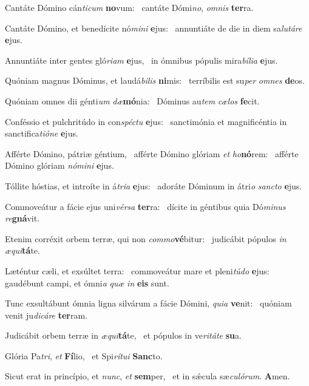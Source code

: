 \item Cantáte Dómino cán\textit{ticum} \textbf{no}vum:~\psstar{} cantáte Dómi\textit{no}, \textit{omnis} \textbf{ter}ra.
\item Cantáte Dómino, et benedícite nó\textit{mini} \textbf{e}jus:~\psstar{} annuntiáte de die in diem sa\textit{lutáre} \textbf{e}jus.
\item Annuntiáte inter gentes gló\textit{riam} \textbf{e}jus,~\psstar{} in ómnibus pópulis mira\textit{bília} \textbf{e}jus.
\item Quóniam magnus Dóminus, et laudá\textit{bilis} \textbf{ni}mis:~\psstar{} terríbilis est su\textit{per} \textit{omnes} \textbf{de}os.
\item Quóniam omnes dii génti\textit{um} \textit{dæ}\textbf{mó}nia:~\psstar{} Dóminus au\textit{tem} \textit{cælos} \textbf{fe}cit.
\item Conféssio et pulchritúdo in con\textit{spéctu} \textbf{e}jus:~\psstar{} sanctimónia et magnificéntia in sanctifica\textit{tióne} \textbf{e}jus.
\item Afférte Dómino, pátriæ géntium,~\pscross{} afférte Dómino glóriam \textit{et} \textit{ho}\textbf{nó}rem:~\psstar{} afférte Dómino glóriam \textit{nómini} \textbf{e}jus.
\item Tóllite hóstias, et introíte in á\textit{tria} \textbf{e}jus:~\psstar{} adoráte Dóminum in átri\textit{o} \textit{sancto} \textbf{e}jus.
\item Commoveátur a fácie ejus uni\textit{vérsa} \textbf{ter}ra:~\psstar{} dícite in géntibus quia Dó\textit{minus} \textit{re}\textbf{gná}vit.
\item Etenim corréxit orbem terræ, qui non \textit{commo}\textbf{vé}bitur:~\psstar{} judicábit pópulos \textit{in} \textit{æqui}\textbf{tá}te.
\item Læténtur cæli, et exsúltet terra:~\pscross{} commoveátur mare et pleni\textit{túdo} \textbf{e}jus:~\psstar{} gaudébunt campi, et ómni\textit{a} \textit{quæ} \textit{in} \textbf{e}\textbf{is} sunt.
\item Tunc exsultábunt ómnia ligna silvárum a fácie Dómini, \textit{quia} \textbf{ve}nit:~\psstar{} quóniam venit ju\textit{dicáre} \textbf{ter}ram.
\item Judicábit orbem terræ in \textit{æqui}\textbf{tá}te,~\psstar{} et pópulos in ve\textit{ritáte} \textbf{su}a.
\item Glória Pa\textit{tri}, \textit{et} \textbf{Fí}lio,~\psstar{} et Spi\textit{rítui} \textbf{Sanc}to.
\item Sicut erat in princípio, et \textit{nunc}, \textit{et} \textbf{sem}per,~\psstar{} et in sǽcula sæ\textit{culórum}. \textbf{A}men.
